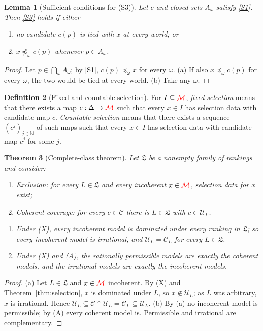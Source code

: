 \documentclass[11pt]{article}
\newcommand{\chg}[1]{{\color{red}#1}}
\newtheorem{theorem}{Theorem}[section]
\newtheorem{lemma}[theorem]{Lemma}
\theoremstyle{definition}
\newtheorem{definition}[theorem]{Definition}
\theoremstyle{remark}
\newcommand{\M}{\mathcal M}
\newcommand{\C}{\mathcal C}
\newcommand{\U}{\mathcal U}
\newcommand{\Lf}{\mathfrak L}
\begin{document}
\begin{lemma}[Sufficient conditions for (S3)]\label{lem:S3}
Let $c$ and closed sets $A_\omega$ satisfy \ref{S1}. Then \ref{S3} holds if either
\begin{enumerate}[label=(\alph*)]
\item no candidate $c(p)$ is tied with $x$ at every world; or
\item $x\not\preceq_\omega c(p)$ whenever $p\in A_\omega$.
\end{enumerate}
\end{lemma}
\begin{proof}
Let $p\in\bigcap_\omega A_\omega$; by \ref{S1}, $c(p)\preceq_\omega x$ for every $\omega$. (a) If also $x\preceq_\omega c(p)$ for every $\omega$, the two would be tied at every world. (b) Take any $\omega$.
\end{proof}

\begin{definition}[Fixed and countable selection]
For $I\subseteq\chg{\M}$, \emph{fixed selection} means that there exists a map $c:\Delta\to\chg{\M}$ such that every $x\in I$ has selection data with candidate map $c$. \emph{Countable selection} means that there exists a sequence $(c^j)_{j\in\mathbb N}$ of such maps such that every $x\in I$ has selection data with candidate map $c^j$ for some $j$.
\end{definition}

\begin{theorem}[Complete-class theorem]\label{thm:complete-class}
Let $\Lf$ be a \chg{nonempty} family of rankings and consider:
\begin{enumerate}
\item[(X)] \emph{Exclusion}: for every $L\in\Lf$ and every incoherent $x\in\chg{\M}$, selection data for $x$ exist;
\item[(A)] \emph{Coherent coverage}: for every $c\in\C$ there is $L\in\Lf$ with $c\in\U_L$\chg{.}
\end{enumerate}
\begin{enumerate}[label=(\alph*)]
\item Under (X), every incoherent model is dominated under every ranking in $\Lf$; so every incoherent model is irrational, and $\U_L=\C_L$ for every $L\in\Lf$.
\item Under (X) and (A), the rationally permissible models are exactly the coherent models, and the irrational models are exactly the incoherent models.
\end{enumerate}
\end{theorem}
\begin{proof}
(a) Let $L\in\Lf$ and $x\in\chg{\M}$ incoherent. By (X) and Theorem~\ref{thm:selection}, $x$ is dominated under $L$, so $x\notin\U_L$; as $L$ was arbitrary, $x$ is irrational. Hence $\U_L\subseteq\C\cap\U_L=\C_L\subseteq\U_L$.
(b) By (a) no incoherent model is permissible; by (A) every coherent model is. Permissible and irrational are complementary.
\end{proof}
\end{document}
